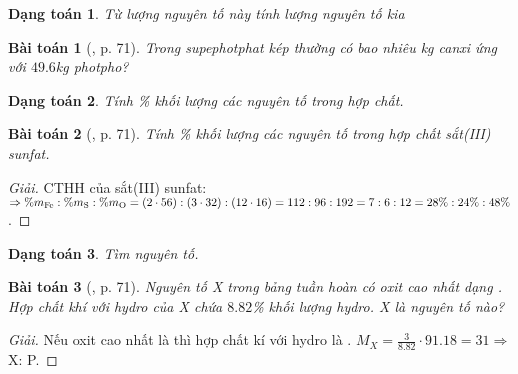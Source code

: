 \documentclass{article}
\newtheorem{baitoan}{Bài toán}
\newtheorem{dangtoan}{Dạng toán}
\begin{document}
\begin{dangtoan}
	Từ lượng nguyên tố này tính lượng nguyên tố kia
\end{dangtoan}

\begin{baitoan}[\cite{Tuan2022}, p. 71]
	Trong supephotphat kép thường có bao nhiêu kg canxi ứng với $49.6$\emph{kg} photpho?
\end{baitoan}

\begin{dangtoan}
	Tính \% khối lượng các nguyên tố trong hợp chất.
\end{dangtoan}

\begin{baitoan}[\cite{Tuan2022}, p. 71]
	Tính \% khối lượng các nguyên tố trong hợp chất sắt(III) sunfat.
\end{baitoan}

\begin{proof}[Giải]
	CTHH của sắt(III) sunfat: $\Rightarrow\%m_{\ce{Fe}}:\%m_{\ce{S}}:\%m_{\ce{O}} = (2\cdot56):(3\cdot32):(12\cdot16) = 112:96:192 = 7:6:12 = 28\%:24\%:48\%$.
\end{proof}

\begin{dangtoan}
	Tìm nguyên tố.
\end{dangtoan}

\begin{baitoan}[\cite{Tuan2022}, p. 71]
	Nguyên tố X trong bảng tuần hoàn có oxit cao nhất dạng \emph{}. Hợp chất khí với hydro của X chứa $8.82$\% khối lượng hydro. X là nguyên tố nào?
\end{baitoan}

\begin{proof}[Giải]
	Nếu oxit cao nhất là  thì hợp chất kí với hydro là . $M_X = \frac{3}{8.82}\cdot91.18 = 31\Rightarrow$ X: P.
\end{proof}



\printbibliography[heading=bibintoc]
	
\end{document}
